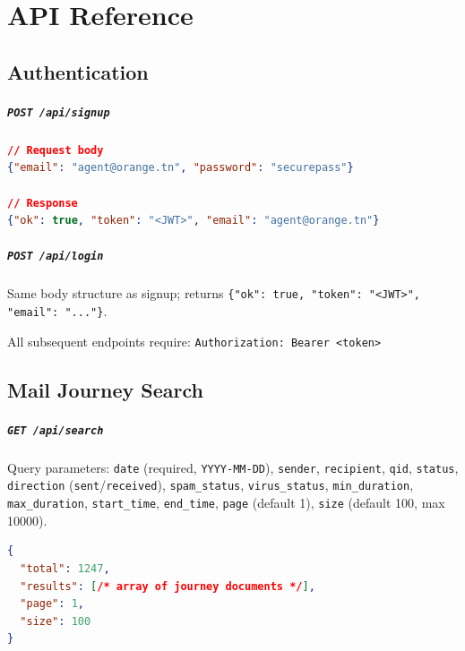 \documentclass[12pt,a4paper,oneside]{report}
\begin{document}
\chapter{API Reference}

\section*{Authentication}

\paragraph{\texttt{POST /api/signup}}
\begin{lstlisting}[style=reportcode,language=json,caption={Signup request / response},label={lst:signup}]
// Request body
{"email": "agent@orange.tn", "password": "securepass"}

// Response
{"ok": true, "token": "<JWT>", "email": "agent@orange.tn"}
\end{lstlisting}

\paragraph{\texttt{POST /api/login}}
Same body structure as signup; returns \texttt{\{"ok": true, "token": "<JWT>", "email": "..."\}}.

All subsequent endpoints require: \texttt{Authorization: Bearer <token>}

\section*{Mail Journey Search}

\paragraph{\texttt{GET /api/search}}

Query parameters: \texttt{date} (required, \texttt{YYYY-MM-DD}), \texttt{sender}, \texttt{recipient}, \texttt{qid}, \texttt{status}, \texttt{direction} (\texttt{sent}/\texttt{received}), \texttt{spam\_status}, \texttt{virus\_status}, \texttt{min\_duration}, \texttt{max\_duration}, \texttt{start\_time}, \texttt{end\_time}, \texttt{page} (default 1), \texttt{size} (default 100, max 10000).

\begin{lstlisting}[style=reportcode,language=json,caption={Search response structure},label={lst:searchresp}]
{
  "total": 1247,
  "results": [/* array of journey documents */],
  "page": 1,
  "size": 100
}
\end{lstlisting}
\end{document}
